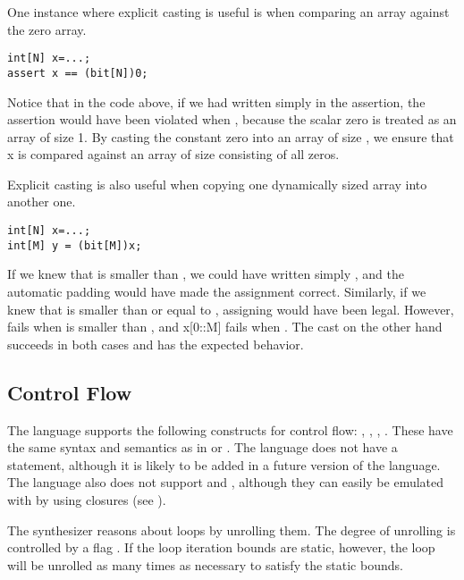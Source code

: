 \begin{Example}
One instance where explicit casting is useful is when comparing an array against the zero array.
\begin{lstlisting}
int[N] x=...;
assert x == (bit[N])0;
\end{lstlisting}
Notice that in the code above, if we had written simply  in the assertion, the assertion would have been violated when , because the scalar zero is treated as an array of size 1. By casting the constant zero into an array of size , we ensure that x is compared against an array of size  consisting of all zeros.
\end{Example}

\begin{Example}
Explicit casting is also useful when copying one dynamically sized array into another one.
\begin{lstlisting}
int[N] x=...;
int[M] y = (bit[M])x;
\end{lstlisting}
If we knew that  is smaller than , we could have written simply , and the automatic padding would have made the assignment correct. Similarly, if we knew that  is smaller than or equal to , assigning  would have been legal. However,  fails when  is smaller than , and x[0::M] fails when . The cast on the other hand succeeds in both cases and has the expected behavior.
\end{Example}

\subsection{Control Flow}
The language supports the following constructs for control flow: , , , . These have the same syntax and semantics as in  or . The language does not have a  statement, although it is likely to be added in a future version of the language. The language also does not support  and , although they can easily be emulated with  by using closures (see ).

The synthesizer reasons about loops by unrolling them. The degree of unrolling is controlled by a flag . If the loop iteration bounds are static, however, the loop will be unrolled as many times as necessary to satisfy the static bounds. 



